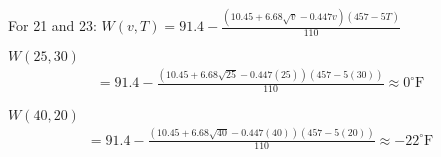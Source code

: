 \documentclass[12pt]{article}
\newenvironment{problem}[2][]{
    \begin{trivlist}
        \item[
            {\bfseries #1}
            {\bfseries #2.}
        ]
}{\end{trivlist}}
\begin{document}
\bigskip 

\noindent For 21 and 23: $W\left(v, T\right) = 91.4 - \frac{\left(10.45 + 6.68 \sqrt{v} - 0.447v\right)\left(457 - 5T\right)}{110}$

\begin{problem}{21}
$W(25, 30)$
\begin{align}
= 91.4 - \frac{\left(10.45 + 6.68 \sqrt{25} - 0.447\left(25\right)\right)\left(457 - 5\left(30\right)\right)}{110} \approx 0^\circ \text{F}
\end{align}
\end{problem}

\begin{problem}{23}
$W(40, 20)$
\begin{align}
= 91.4 - \frac{\left(10.45 + 6.68 \sqrt{40} - 0.447\left(40\right)\right)\left(457 - 5\left(20\right)\right)}{110} \approx -22^\circ \text{F}
\end{align}
\end{problem}
\end{document}
